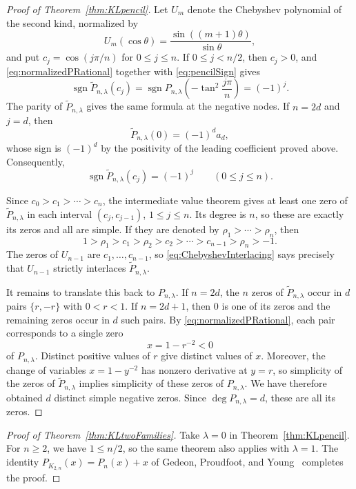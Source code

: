 \documentclass[11pt]{article}
\theoremstyle{plain}
\theoremstyle{remark}
\DeclareMathOperator{\sgn}{sgn}
\begin{document}
\begin{proof}[Proof of Theorem~\ref{thm:KLpencil}]
Let $U_m$ denote the Chebyshev polynomial of the second kind,
normalized by
\begin{equation}\label{eq:ChebyshevSecondKind}
U_m(\cos\theta)=\frac{\sin((m+1)\theta)}{\sin\theta},
\end{equation}
and put $c_j=\cos(j\pi/n)$ for $0\le j\le n$.  If
$0\le j<n/2$, then $c_j>0$, and
\eqref{eq:normalizedPRational} together with \eqref{eq:pencilSign}
gives
\[
\sgn\widetilde P_{n,\lambda}(c_j)
=\sgn P_{n,\lambda}\!\left(-\tan^2\frac{j\pi}{n}\right)
=(-1)^j.
\]
The parity of $\widetilde P_{n,\lambda}$ gives the same formula at
the negative nodes.  If $n=2d$ and $j=d$, then
\[
\widetilde P_{n,\lambda}(0)=(-1)^d a_d,
\]
whose sign is $(-1)^d$ by the positivity of the leading coefficient
proved above.  Consequently,
\begin{equation}\label{eq:normalizedNodeSign}
\sgn\widetilde P_{n,\lambda}(c_j)=(-1)^j
\qquad(0\le j\le n).
\end{equation}

Since $c_0>c_1>\cdots>c_n$, the intermediate value theorem gives at
least one zero of $\widetilde P_{n,\lambda}$ in each interval
$(c_j,c_{j-1})$, $1\le j\le n$.  Its degree is $n$, so these are
exactly its zeros and all are simple.  If they are denoted by
$\rho_1>\cdots>\rho_n$, then
\begin{equation}\label{eq:ChebyshevInterlacing}
1>\rho_1>c_1>\rho_2>c_2>\cdots>
c_{n-1}>\rho_n>-1.
\end{equation}
The zeros of $U_{n-1}$ are $c_1,\ldots,c_{n-1}$, so
\eqref{eq:ChebyshevInterlacing} says precisely that $U_{n-1}$
strictly interlaces $\widetilde P_{n,\lambda}$.

It remains to translate this back to $P_{n,\lambda}$.  If $n=2d$,
the $n$ zeros of $\widetilde P_{n,\lambda}$ occur in $d$ pairs
$\{r,-r\}$ with $0<r<1$.  If $n=2d+1$, then $0$ is one of its
zeros and the remaining zeros occur in $d$ such pairs.  By
\eqref{eq:normalizedPRational}, each pair corresponds to a single zero
\[
x=1-r^{-2}<0
\]
of $P_{n,\lambda}$.  Distinct positive values of $r$ give distinct
values of $x$.  Moreover, the change of variables
$x=1-y^{-2}$ has nonzero derivative at $y=r$, so simplicity of the
zeros of $\widetilde P_{n,\lambda}$ implies simplicity of these
zeros of $P_{n,\lambda}$.  We have therefore obtained $d$ distinct
simple negative zeros.  Since $\deg P_{n,\lambda}=d$, these are all
its zeros.
\end{proof}

\begin{proof}[Proof of Theorem~\ref{thm:KLtwoFamilies}]
Take $\lambda=0$ in Theorem~\ref{thm:KLpencil}.  For $n\ge2$, we have
$1\le n/2$, so the same theorem also applies with $\lambda=1$.  The
identity
$P_{K_{2,n}}(x)=P_n(x)+x$ of Gedeon, Proudfoot, and
Young~\cite[Theorem~5.8]{GPY} completes the proof.
\end{proof}
\end{document}
